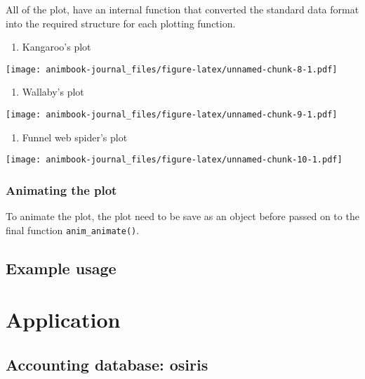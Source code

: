 All of the plot, have an internal function that converted the standard data format into the required structure for each plotting function.

\begin{enumerate}
\def\labelenumi{\arabic{enumi}.}
\tightlist
\item
  Kangaroo's plot
\end{enumerate}

\texttt{[image: animbook-journal\_files/figure-latex/unnamed-chunk-8-1.pdf]}

\begin{enumerate}
\def\labelenumi{\arabic{enumi}.}
\setcounter{enumi}{1}
\tightlist
\item
  Wallaby's plot
\end{enumerate}

\texttt{[image: animbook-journal\_files/figure-latex/unnamed-chunk-9-1.pdf]}

\begin{enumerate}
\def\labelenumi{\arabic{enumi}.}
\setcounter{enumi}{2}
\tightlist
\item
  Funnel web spider's plot
\end{enumerate}

\texttt{[image: animbook-journal\_files/figure-latex/unnamed-chunk-10-1.pdf]}

\hypertarget{animating-the-plot}{%
\subsubsection{Animating the plot}\label{animating-the-plot}}

To animate the plot, the plot need to be save as an object before passed on to the final function \texttt{anim\_animate()}.

\hypertarget{example-usage}{%
\subsection{Example usage}\label{example-usage}}

\hypertarget{application}{%
\section{Application}\label{application}}

\hypertarget{accounting-database-osiris}{%
\subsection{Accounting database: osiris}\label{accounting-database-osiris}}

